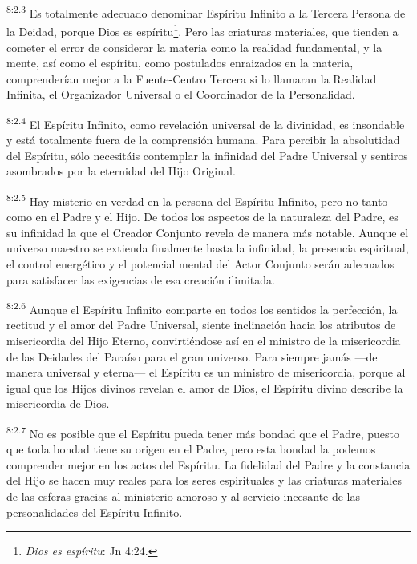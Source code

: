 \par
\textsuperscript{8:2.3} Es totalmente adecuado denominar Espíritu Infinito a la Tercera Persona de la Deidad, porque Dios es espíritu\footnote{\textit{Dios es espíritu}: Jn 4:24.}. Pero las criaturas materiales, que tienden a cometer el error de considerar la materia como la realidad fundamental, y la mente, así como el espíritu, como postulados enraizados en la materia, comprenderían mejor a la Fuente-Centro Tercera si lo llamaran la Realidad Infinita, el Organizador Universal o el Coordinador de la Personalidad.

\par
\textsuperscript{8:2.4} El Espíritu Infinito, como revelación universal de la divinidad, es insondable y está totalmente fuera de la comprensión humana. Para percibir la absolutidad del Espíritu, sólo necesitáis contemplar la infinidad del Padre Universal y sentiros asombrados por la eternidad del Hijo Original.

\par
\textsuperscript{8:2.5} Hay misterio en verdad en la persona del Espíritu Infinito, pero no tanto como en el Padre y el Hijo. De todos los aspectos de la naturaleza del Padre, es su infinidad la que el Creador Conjunto revela de manera más notable. Aunque el universo maestro se extienda finalmente hasta la infinidad, la presencia espiritual, el control energético y el potencial mental del Actor Conjunto serán adecuados para satisfacer las exigencias de esa creación ilimitada.

\par
\textsuperscript{8:2.6} Aunque el Espíritu Infinito comparte en todos los sentidos la perfección, la rectitud y el amor del Padre Universal, siente inclinación hacia los atributos de misericordia del Hijo Eterno, convirtiéndose así en el ministro de la misericordia de las Deidades del Paraíso para el gran universo. Para siempre jamás ---de manera universal y eterna--- el Espíritu es un ministro de misericordia, porque al igual que los Hijos divinos revelan el amor de Dios, el Espíritu divino describe la misericordia de Dios.

\par
\textsuperscript{8:2.7} No es posible que el Espíritu pueda tener más bondad que el Padre, puesto que toda bondad tiene su origen en el Padre, pero esta bondad la podemos comprender mejor en los actos del Espíritu. La fidelidad del Padre y la constancia del Hijo se hacen muy reales para los seres espirituales y las criaturas materiales de las esferas gracias al ministerio amoroso y al servicio incesante de las personalidades del Espíritu Infinito.

